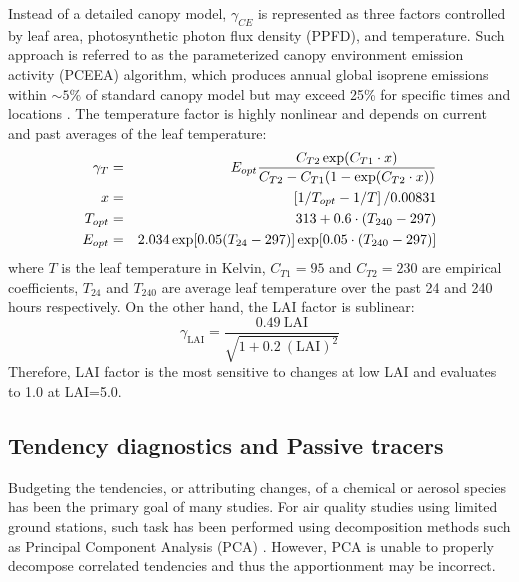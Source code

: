	Instead of a detailed canopy model, $\gamma_{CE}$ is represented as three factors controlled by leaf area, photosynthetic photon flux density (PPFD), and temperature. Such approach is referred to as the parameterized canopy environment emission activity (PCEEA) algorithm, which produces annual global isoprene emissions within $\sim 5\%$ of standard canopy model but may exceed 25\% for specific times and locations \citep{Guenther:2006kl}. The temperature factor is highly nonlinear and depends on current and past averages of the leaf temperature:
	\begin{eqnarray}
		\gamma_T &=& E_{opt}\frac{C_{T2}\exp(C_{T1}\cdot x)}{C_{T2}-C_{T1}(1-\exp(C_{T2}\cdot x))} \label{eqn:MEGAN-gammaT}  \\
		x &=& \left[1/T_{opt}-1/T\right]\large/0.00831 \\
		T_{opt} &=& 313 + 0.6 \cdot (T_{240}-297) \\
		E_{opt} &=& 2.034 \exp[0.05(T_{24}-297)]\exp[0.05\cdot(T_{240}-297)]
	\end{eqnarray}
	where $T$ is the leaf temperature in Kelvin, $C_{T1}=95$ and $C_{T2}=230$ are empirical coefficients, $T_{24}$ and $T_{240}$ are average leaf temperature over the past 24 and 240 hours respectively. On the other hand, the LAI factor is sublinear:
	\begin{equation}\label{eqn:MEGAN-gammaLAI}
		\gamma_{\mathrm{LAI}} = \frac{0.49~\mathrm{LAI}}{\sqrt{1 + 0.2~(\mathrm{LAI})^2}}
	\end{equation}
	Therefore, LAI factor is the most sensitive to changes at low LAI  and evaluates to 1.0 at LAI=5.0.

\subsection{Tendency diagnostics and Passive tracers}\label{ssec:2006/method/diagnostics}

	Budgeting the tendencies, or attributing changes, of a chemical or aerosol species has been the primary goal of many studies. For air quality studies using limited ground stations, such task has been performed using decomposition methods such as Principal Component Analysis (PCA) \citep[][and references therein]{Langford:2009mb}. However, PCA is unable to properly decompose correlated tendencies and thus the apportionment may be incorrect.
	
